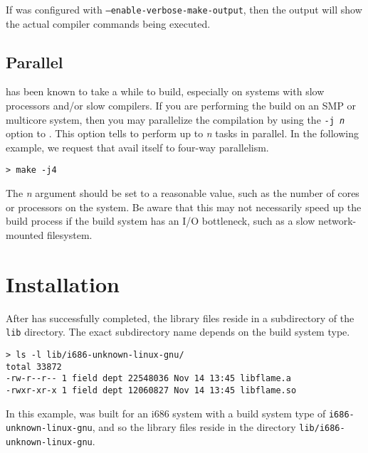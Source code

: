 If \libflame was configured with {\tt --enable-verbose-make-output}, then
the output will show the actual compiler commands being executed.

\subsection{Parallel \make}

\libflame has been known to take a while to build, especially on systems
with slow processors and/or slow compilers.
If you are performing the build on an SMP or multicore system, then you
may parallelize the compilation by using the {\tt -j {\em n}} option to
\makens.
This option tells \make to perform up to {\em n} tasks in parallel.
In the following example, we request that \make avail itself to four-way
parallelism.

\begin{Verbatim}[frame=single,framesep=2.5mm,xleftmargin=5mm,commandchars=\\\{\},fontsize=\footnotesize]
> make -j4
\end{Verbatim}

\noindent
The {\em n} argument should be set to a reasonable value, such as
the number of cores or processors on the system.
Be aware that this may not necessarily speed up the build process if the
build system has an I/O bottleneck, such as a slow network-mounted
filesystem.





\section{Installation}


After \make has successfully completed, the \libflame library files
reside in a subdirectory of the {\tt lib} directory.
The exact subdirectory name depends on the build system type.

\begin{Verbatim}[frame=single,framesep=2.5mm,xleftmargin=5mm,commandchars=\\\{\},fontsize=\footnotesize]
> ls -l lib/i686-unknown-linux-gnu/
total 33872
-rw-r--r-- 1 field dept 22548036 Nov 14 13:45 libflame.a
-rwxr-xr-x 1 field dept 12060827 Nov 14 13:45 libflame.so
\end{Verbatim}

\noindent
In this example, \libflame was built for an i686 system with a
build system type of {\tt i686-unknown-linux-gnu}, and so the
library files reside in the directory
{\tt lib/i686-unknown-linux-gnu}.

